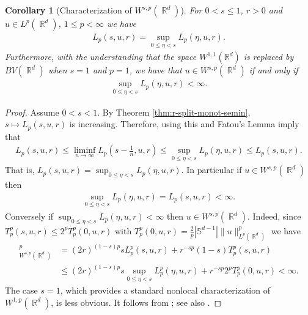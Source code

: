 \documentclass[12pt, reqno]{amsart}%
\theoremstyle{plain}  %
\newtheorem{corollary}[theorem]{Corollary}
\theoremstyle{definition}  %
\theoremstyle{remark}
\numberwithin{equation}{section}
\DeclareMathOperator{\R}{\mathbb{R}}
\begin{document}
\begin{corollary}[Characterization of $W^{s,p}(\R^d)$]
For $0< s\leq 1$, $r>0$ and $u\in L^p(\R^d)$, $1\leq p<\infty$ we have
\begin{align*}
L_p(s,u,r) = \sup_{0\leq \eta< s} L_p(\eta,u,r).
\end{align*}
Furthermore, with the understanding that the space $W^{1,1}(\mathbb{R}^d)$ is replaced by $BV(\R^d)$ when $s = 1$ and $p = 1$, we have that $u \in W^{s,p}(\R^d)$ if and only if
\begin{align*}
\sup_{0 \leq \eta < s} L_p(\eta,u,r) < \infty.
\end{align*}
\end{corollary}
\begin{proof}
Assume  $0<s<1$. By Theorem \ref{thm:r-split-monot-semin}, $s\mapsto L_p(s,u,r)$ is increasing. Therefore, using this and Fatou's Lemma imply that
\begin{align*}
L_p(s,u,r)\leq \liminf_{n\to\infty} L_p(s-\tfrac{1}{n},u,r)\leq \sup_{0\leq \eta< s} L_p(\eta,u,r)\leq L_p(s,u,r).
\end{align*}
That is, $L_p(s,u,r) = \sup_{0\leq \eta< s} L_p(\eta,u,r).$ In particular  if $u\in W^{s,p}(\R^d)$ then
\begin{align*}
\sup_{0\leq \eta< s} L_p(\eta,u,r)=L_p(s,u,r) <\infty.
\end{align*}
Conversely if $
\sup_{0\leq \eta< s} L_p(\eta,u,r)<\infty$ then $u\in W^{s,p}(\R^d)$. Indeed, since
$T_p^p(s, u,r)\leq 2^pT_p^p(0, u,r)$ with $T_p^p(0, u,r) =\frac{2}{p}|\mathbb{S}^{d-1}|\|u\|^p_{L^p(\R^d)}$ we have
\begin{align*}
[u]^p_{W^{s,p}(\R^d)}
&= (2r)^{(1-s)p} s L_p^p(s, u,r) + r^{-sp} (1-s)T_p^p(s, u,r)\\
&\leq (2r)^{(1-s)p} s \sup_{0\leq \eta< s} L^p_p(\eta,u,r) + r^{-sp} 2^pT_p^p(0, u,r)<\infty.
\end{align*}
The case $s = 1$, which provides a standard nonlocal characterization of $W^{1,p}(\R^d)$, is less obvious.
It follows from
\cite[Theorems 1.4 and 1.4$'$]{Fog23}; see also \cite{BBM01}.
\end{proof}
\end{document}
